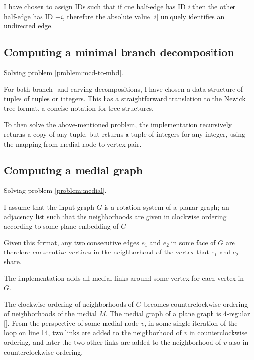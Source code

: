 \documentclass{article}
\begin{document}
	I have chosen to assign IDs such that if one half-edge has ID $i$ then the other half-edge has ID $-i$, therefore the absolute value $|i|$ uniquely identifies an undirected edge.


	\subsection{Computing a minimal branch decomposition}\label{impl:mcd-to-mbd}
		
		Solving problem \ref{problem:mcd-to-mbd}.

		For both branch- and carving-decompositions, I have chosen a data structure of tuples of tuples or integers. This has a straightforward translation to the Newick tree format, a concise notation for tree structures.

		To then solve the above-mentioned problem, the implementation recursively returns a copy of any tuple, but returns a tuple of integers for any integer, using the mapping from medial node to vertex pair.

		
	\subsection{Computing a medial graph}\label{impl:medial}
		
		Solving problem \ref{problem:medial}.

		I assume that the input graph $G$ is a rotation system of a planar graph; an adjacency list such that the neighborhoods are given in clockwise ordering according to some plane embedding of $G$.
		
		Given this format, any two consecutive edges $e_1$ and $e_2$ in some face of $G$ are therefore consecutive vertices in the neighborhood of the vertex that $e_1$ and $e_2$ share.

		The implementation adds all medial links around some vertex for each vertex in $G$. 
		
		The clockwise ordering of neighborhoods of $G$ becomes counterclockwise ordering of neighborhoods of the medial $M$. The medial graph of a plane graph is 4-regular \ref{}. From the perspective of some medial node $v$, in some single iteration of the loop on line 14, two links are added to the neighborhood of $v$ in counterclockwise ordering, and later the two other links are added to the neighborhood of $v$ also in counterclockwise ordering.
		
\end{document}

